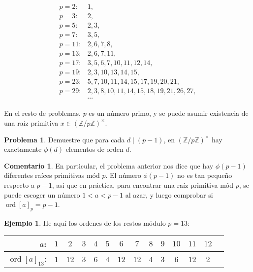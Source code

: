 \documentclass{article}
\newcommand{\ZZ}{\mathbb{Z}}
\DeclareMathOperator{\ord}{ord}
\theoremstyle{definition}
\newtheorem{problema}{Problema}[section]
\newtheorem*{comentario}{Comentario}
\newtheorem*{ejemplo}{Ejemplo}
\begin{document}
\begin{align*}
  p = 2\colon & 1, \\
  p = 3\colon & 2, \\
  p = 5\colon & 2, 3, \\
  p = 7\colon & 3, 5, \\
  p = 11\colon & 2, 6, 7, 8, \\
  p = 13\colon & 2, 6, 7, 11, \\
  p = 17\colon & 3, 5, 6, 7, 10, 11, 12, 14, \\
  p = 19\colon & 2, 3, 10, 13, 14, 15, \\
  p = 23\colon & 5, 7, 10, 11, 14, 15, 17, 19, 20, 21, \\
  p = 29\colon & 2, 3, 8, 10, 11, 14, 15, 18, 19, 21, 26, 27, \\
              & \cdots
\end{align*}

En el resto de problemas, $p$ es un número primo, y se puede asumir existencia
de una raíz primitiva $x \in (\ZZ/p\ZZ)^\times$.

\begin{problema}
  Demuestre que para cada $d \mid (p-1)$, en $(\ZZ/p\ZZ)^\times$ hay exactamente
  $\phi(d)$ elementos de orden $d$.
\end{problema}

\begin{comentario}
  En particular, el problema anterior nos dice que hay $\phi (p-1)$ diferentes
  raíces primitivas mód $p$. El número $\phi (p-1)$ no es tan pequeño respecto a
  $p-1$, así que en práctica, para encontrar una raíz primitiva mód $p$,
  se puede escoger un número $1 < a < p-1$ al azar, y luego comprobar si
  $\ord [a]_p = p-1$.
\end{comentario}

\begin{ejemplo}
  He aquí los ordenes de los restos módulo $p = 13$:

  \begin{center}
    \begin{tabular}{rccccccccccccc}
      \hline
      $a$: & $1$ & $2$ & $3$ & $4$ & $5$ & $6$ & $7$ & $8$ & $9$ & $10$ & $11$ & $12$ \\
      \hline
      $\ord [a]_{13}$: & $1$ & $12$ & $3$ & $6$ & $4$ & $12$ & $12$ & $4$ & $3$ & $6$ & $12$ & $2$ \\
      \hline
    \end{tabular}
  \end{center}
\end{ejemplo}
\end{document}
